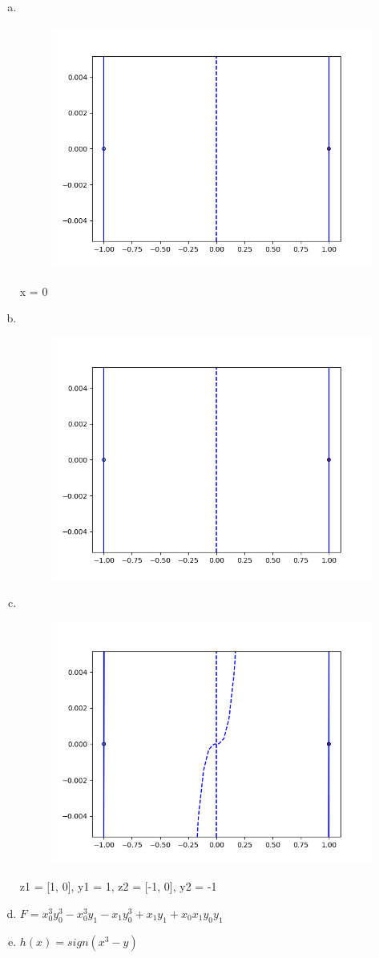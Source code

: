 \documentclass[11pt]{article}
\begin{document}
\begin{enumerate} [(a)]
	\item \ \begin{figure}[htb] 
			{\includegraphics[height=8cm]{p3a.png}}
	\end{figure}
	x = 0
	\item\ \begin{figure}[htb] 
      {\includegraphics[height=8cm]{p3a.png}}
  \end{figure}
  \newpage
	\item\ \begin{figure}[htb] 
			{\includegraphics[height=8cm]{p3c.png}}
	\end{figure}
  z1 = [1, 0], y1 = 1, z2 = [-1, 0], y2 = -1
	\item $F=x_0^{3}y_0^{3}-x_0^{3}y_1-x_1y^3_{0}+x_1y_1+x_0x_1y_0y_1$

	\item $h(x)=sign(x^3-y)$
\end{enumerate}
\end{document}
